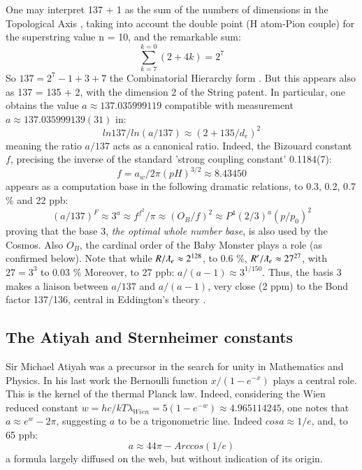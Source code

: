 \documentclass[twoside,draft]{article}
\begin{document}
\begin{sloppypar}
One may interpret 137 + 1 as
the sum of the numbers of dimensions in the Topological Axis \cite{Sanchez1}, taking into account the double
point (H atom-Pion couple) for the superstring value n = 10, and the remarkable sum:
\begin{equation}
\sum_{k=7}^{k=0}(2 + 4 k ) = 2^{7}
\end{equation}
So $137 = 2^{7} - 1 + 3 + 7$ the Combinatorial Hierarchy form \cite{Sanchez1}. But this appears also as 137 = 135 + 2,
with the dimension 2 of the String patent. In particular, one obtains the value $a \approx 137.035999119$
compatible with measurement $a \approx 137.035999139(31)$ in:
\begin{equation}
ln137/ln(a/137) \approx (2+135/d_{e})^{2}
\end{equation}
meaning the ratio $a/137$ acts as a canonical ratio. Indeed, the Bizouard constant $f$, precising \cite{Sanchez1} the inverse of the standard 'strong coupling constant' 0.1184(7): $$f = a_w/2\pi(pH)^{3/2} \approx 8.43450$$ appears as a computation base in the following dramatic relations, to 0.3, 0.2, 0.7 \% and 22 ppb:
$$(a/137)^F \approx 3^a \approx f^{f^2}/\pi \approx (O_B/f)^2 \approx P^4 (2/3)^a (p/p_0)^2 $$
proving that the base 3, \textit{the optimal whole number base}, is also used by the Cosmos. Also $O_B$, the cardinal order of the Baby Monster plays a role (as confirmed below). 
Note that while $R/\lambdabar_e \approx 2^{128}$, to 0.6 \%, $R^{\prime}/\lambdabar_e \approx 27^{27}$, with $27 = 3^3$ to 0.03 \%  Moreover, to 27 ppb:
$ a/(a-1) \approx 3^{1/150} $. Thus, the basis 3 makes a liaison between $a/137$ and $a/(a-1)$, very close (2 ppm) to the Bond factor 137/136, central in Eddington's theory \cite{Eddington}.

\subsection{The Atiyah and Sternheimer constants}
    Sir Michael Atiyah was a precursor in the search for unity in Mathematics and Physics. 
In his last work \cite{Atiyah1} the Bernoulli function $x/(1-e^{-x})$ plays a central role. This is the kernel of the thermal Planck law. Indeed, considering the Wien reduced constant $w = hc/kT\lambda_{Wien} = 5 (1-e^{-w}) \approx 4.965114245$, one notes that $a \approx e^w -2\pi$, suggesting $a$ to be a trigonometric line. Indeed $cosa \approx 1/e$, and, to 65 ppb:
\begin{equation}
a \approx 44\pi - Arccos(1/e)
\end{equation}
a formula largely diffused on the web, but without indication of its origin.    
    

\end{sloppypar}
\end{document}
